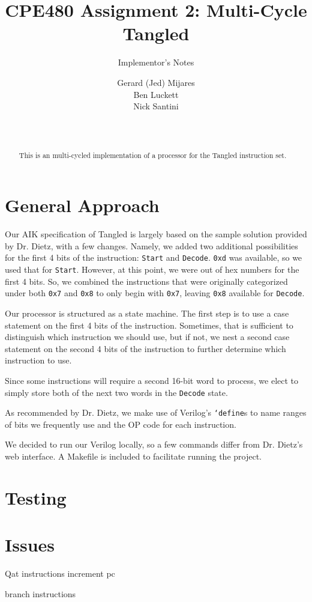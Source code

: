 \documentclass{sig-alternate-05-2015}
\begin{document}

\title{CPE480 Assignment 2: Multi-Cycle Tangled }
\subtitle{Implementor's Notes}

\author{
Gerard (Jed) Mijares\\
Ben Luckett\\
Nick Santini\\
       \\
       \\
}

\maketitle
\begin{abstract}
This is an multi-cycled implementation of a processor for the Tangled instruction set.
\end{abstract}

\section{General Approach}

Our AIK specification of Tangled is largely based on the sample solution provided by Dr. Dietz, with a few changes. Namely, we added two additional possibilities for the first 4 bits of the instruction: \texttt{Start} and \texttt{Decode}. \texttt{0xd} was available, so we used that for \texttt{Start}. However, at this point, we were out of hex numbers for the first 4 bits. So, we combined the instructions that were originally categorized under both \texttt{0x7} and \texttt{0x8} to only begin with \texttt{0x7}, leaving \texttt{0x8} available for \texttt{Decode}.

Our processor is structured as a state machine. The first step is to use a case statement on the first 4 bits of the instruction. Sometimes, that is sufficient to distinguish which instruction we should use, but if not, we nest a second case statement on the second 4 bits of the instruction to further determine which instruction to use.

Since some instructions will require a second 16-bit word to process, we elect to simply store both of the next two words in the \texttt{Decode} state.

As recommended by Dr. Dietz, we make use of Verilog's \texttt{`define}s to name ranges of bits we frequently use and the OP code for each instruction.

We decided to run our Verilog locally, so a few commands differ from Dr. Dietz's web interface. A Makefile is included to facilitate running the project.

\vfill\pagebreak

\section{Testing}

\section{Issues}

Qat instructions increment pc

branch instructions
\end{document}
